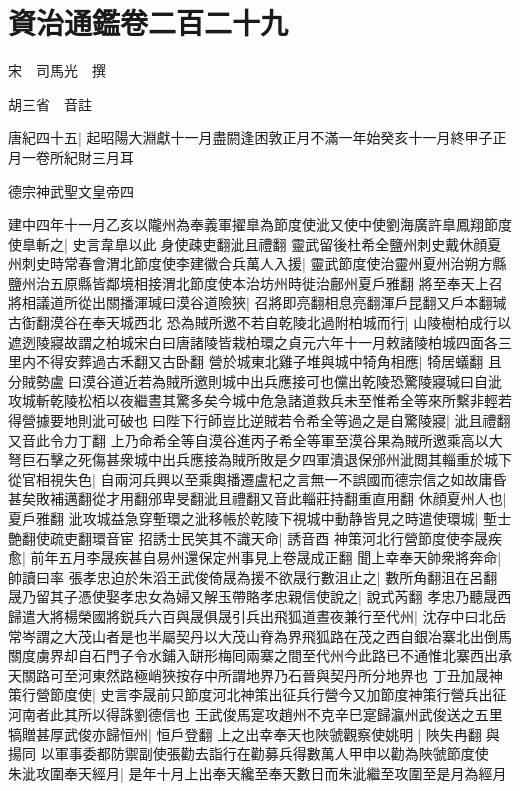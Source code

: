 \chapter{資治通鑑卷二百二十九}
宋　司馬光　撰

胡三省　音註

唐紀四十五|{
	起昭陽大淵獻十一月盡閼逢困敦正月不滿一年始癸亥十一月終甲子正月一卷所紀財三月耳}


德宗神武聖文皇帝四

建中四年十一月乙亥以隴州為奉義軍擢臯為節度使泚又使中使劉海廣許臯鳳翔節度使臯斬之|{
	史言韋臯以此身使疎吏翻泚且禮翻}
靈武留後杜希全鹽州刺史戴休顔夏州刺史時常春會渭北節度使李建徽合兵萬人入援|{
	靈武節度使治靈州夏州治朔方縣鹽州治五原縣皆鄰境相接渭北節度使本治坊州時徙治鄜州夏戶雅翻}
將至奉天上召將相議道所從出關播渾瑊曰漠谷道險狹|{
	召將即亮翻相息亮翻渾戶昆翻又戶本翻瑊古衘翻漠谷在奉天城西北}
恐為賊所邀不若自乾陵北過附柏城而行|{
	山陵樹柏成行以遮迾陵寢故謂之柏城宋白曰唐諸陵皆栽柏環之貞元六年十一月敕諸陵柏城四面各三里内不得安葬過古禾翻又古卧翻}
營於城東北雞子堆與城中犄角相應|{
	犄居蟻翻}
且分賊勢盧曰漠谷道近若為賊所邀則城中出兵應接可也儻出乾陵恐驚陵寢瑊曰自泚攻城斬乾陵松栢以夜繼晝其驚多矣今城中危急諸道救兵未至惟希全等來所繫非輕若得營據要地則泚可破也曰陛下行師豈比逆賊若令希全等過之是自驚陵寢|{
	泚且禮翻又音此令力丁翻}
上乃命希全等自漠谷進丙子希全等軍至漠谷果為賊所邀乘高以大弩巨石擊之死傷甚衆城中出兵應接為賊所敗是夕四軍潰退保邠州泚閲其輜重於城下從官相視失色|{
	自兩河兵興以至乘輿播遷盧杞之言無一不誤國而德宗信之如故庸昏甚矣敗補邁翻從才用翻邠卑旻翻泚且禮翻又音此輜莊持翻重直用翻}
休顔夏州人也|{
	夏戶雅翻}
泚攻城益急穿塹環之泚移帳於乾陵下視城中動静皆見之時遣使環城|{
	塹士艶翻使疏吏翻環音宦}
招誘士民笑其不識天命|{
	誘音酉}
神策河北行營節度使李晟疾愈|{
	前年五月李晟疾甚自易州還保定州事見上卷晟成正翻}
聞上幸奉天帥衆將奔命|{
	帥讀曰率}
張孝忠迫於朱滔王武俊倚晟為援不欲晟行數沮止之|{
	數所角翻沮在呂翻}
晟乃留其子憑使娶孝忠女為婦又解玉帶賂孝忠親信使說之|{
	說式芮翻}
孝忠乃聽晟西歸遣大將楊榮國將鋭兵六百與晟俱晟引兵出飛狐道晝夜兼行至代州|{
	沈存中曰北岳常岑謂之大茂山者是也半屬契丹以大茂山脊為界飛狐路在茂之西自銀冶寨北出倒馬關度虜界却自石門子令水鋪入缾形梅囘兩寨之間至代州今此路已不通惟北寨西出承天關路可至河東然路極峭狹按存中所謂地界乃石晉與契丹所分地界也}
丁丑加晟神策行營節度使|{
	史言李晟前只節度河北神策出征兵行營今又加節度神策行營兵出征河南者此其所以得誅劉德信也}
王武俊馬寔攻趙州不克辛巳寔歸瀛州武俊送之五里犒贈甚厚武俊亦歸恒州|{
	恒戶登翻}
上之出幸奉天也陜虢觀察使姚明|{
	陜失冉翻與揚同}
以軍事委都防禦副使張勸去詣行在勸募兵得數萬人甲申以勸為陜虢節度使　朱泚攻圍奉天經月|{
	是年十月上出奉天纔至奉天數日而朱泚繼至攻圍至是月為經月}
